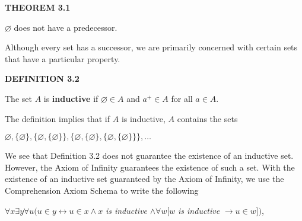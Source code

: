 \documentclass[12pt, a4paper]{article}
\begin{document}
\vspace{4mm}

\noindent\blacksquare\textbf{ THEOREM 3.1}\par

\vspace{4mm}

$\varnothing$ does not have a predecessor.\par

\vspace{4mm}

Although every set has a successor, we are primarily concerned with certain sets that have a particular property.\par

\vspace{4mm}

\noindent\blacksquare\textbf{ DEFINITION 3.2}\par

\vspace{4mm}

The set $A$ is \textbf{inductive} if $\varnothing\in A$ and $a^+\in A$ for all $a\in A$.\par

\vspace{4mm}

\noindent The definition implies that if $A$ is inductive, $A$ contains the sets\par

\vspace{4mm}

\centerline{$\varnothing, \{\varnothing\}, \{\varnothing,\{\varnothing\}\},\{\varnothing,\{\varnothing\},\{\varnothing,\{\varnothing\}\}\},\ldots$}

\vspace{4mm}

\noindent We see that Definition 3.2 does not guarantee the existence of an inductive set. However, the Axiom of Infinity guarantees the existence of such a set. With the existence of an inductive set guaranteed by the Axiom of Infinity, we use the Comprehension Axiom Schema to write the following\par

\vspace{4mm}

\centerline{$\forall x\exists y\forall u(u\in y\leftrightarrow u\in x\wedge x$\textit{ is inductive }$\wedge\forall w[w$\textit{ is inductive }$\rightarrow u\in w])$,}

\vspace{4mm}
\end{document}

